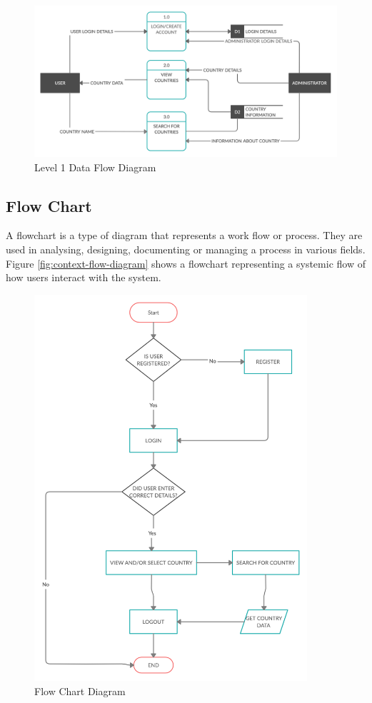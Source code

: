 \documentclass[twoside, a4paper, 12pt]{report}
\begin{document}
\begin{figure} [ht]
	\centering
	\includegraphics[width=1.0\textwidth]{DFD.png}
	\caption{Level 1 Data Flow Diagram}
	\label{fig:level-1-data-flow-diagram}
\end{figure}

\subsection{Flow Chart}
A flowchart is a type of diagram that represents a work flow or process. They are used in analysing, designing, documenting or managing a process in various fields.\\
\indent
Figure \ref{fig:context-flow-diagram} shows a flowchart representing a systemic flow of how users interact with the system.

\begin{figure}
	\centering
	\includegraphics[width=0.9\textwidth]{flowchart.png}
	\caption{Flow Chart Diagram}
	\label{fig:flow-chart-diagram}
\end{figure}
\end{document}
